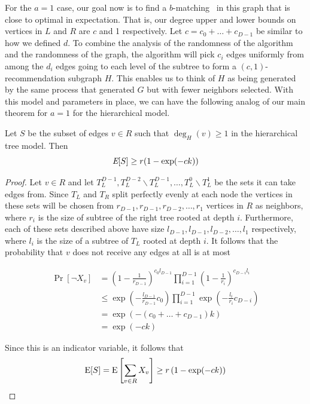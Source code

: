 For the $a=1$ case, our goal now is to find a $b$-matching~\cite{Gabow1983} in this
graph that is close to optimal in expectation. That is, our degree
upper and lower bounds on vertices in $L$ and $R$ are $c$ and 1
respectively. Let $c = c_0 + \ldots + c_{D-1}$ be similar to how we
defined $d$.  To combine the analysis of the randomness of the
algorithm and the randomness of the graph, the algorithm will pick
$c_{i}$ edges uniformly from among the $d_{i}$ edges going to each
level of the subtree to form a $(c,1)$-recommendation subgraph $H$.
This enables us to think of $H$ as being generated by the same process that generated $G$
but with fewer neighbors selected. With this model and
parameters in place, we can have the following analog of our main
theorem for $a=1$ for the hierarchical model.

\begin{thm}
Let $S$ be the subset of edges $v\in R$ such that $\deg_H(v) \geq 1$ in the hierarchical tree model. Then
\[ \emph{\text{E}}[S] \geq r(1-\exp(-ck)) \]
\end{thm}

\begin{proof}
Let $v\in R$ and let $T_L^{D-1}, T_L^{D-2}\backslash T_L^{D-1},
\ldots, T_L^0\backslash T_L^1$ be the sets it can take edges
from. Since $T_L$ and $T_R$ split perfectly evenly at each node the
vertices in these sets will be chosen from $r_{D-1}, r_{D-1},
r_{D-2},\ldots, r_{1}$ vertices in $R$ as neighbors,
where $r_i$ is the size of subtree of the right tree rooted at depth
$i$. Furthermore, each of these sets described above have size
$l_{D-1}, l_{D-1}, l_{D-2}, \ldots, l_{1}$ respectively, where $l_i$
is the size of a subtree of $T_L$ rooted at depth $i$. It follows that
the probability that $v$ does not receive any edges at all is at most

\begin{align*}
	      \Pr[\lnot X_v]
	&=    \left(1-\frac{1}{r_{D-1}}\right)^{c_0l_{D-1}}\prod_{i=1}^{D-1}\left(1 - \frac{1}{r_i}\right)^{c_{D-i} l_i} \\
	&\leq \exp\left(-\frac{l_{D-1}}{r_{D-1}}c_0\right)\prod_{i=1}^{D-1} \exp\left(-\frac{l_i}{r_i}c_{D-i}\right) \\
	&=    \exp\left(-(c_0 + \ldots + c_{D-1})k\right) \\
	&=    \exp(-ck)
\end{align*}

Since this is an indicator variable, it follows that
\[ \text{E}[S] = \text{E}\left[\sum_{v \in R} X_v \right] \geq r \left(1-\exp(-ck)\right) \]
\end{proof}


